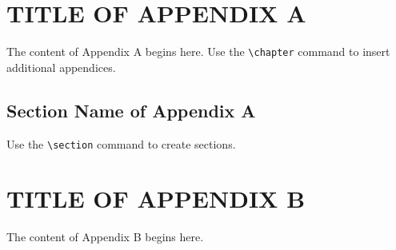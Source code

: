 \documentclass[11pt]{report}
\begin{document}
\begin{append}
\chapter{\MakeUppercase{Title of Appendix A}}
The content of Appendix A begins here. Use the \verb|\chapter| command to insert additional appendices.
\section{Section Name of Appendix A}
Use the \verb|\section| command to create sections.
\chapter{\MakeUppercase{Title of Appendix B}}
The content of Appendix B begins here.
\end{append}

\begin{bibliof}

\end{bibliof}
\end{document}

